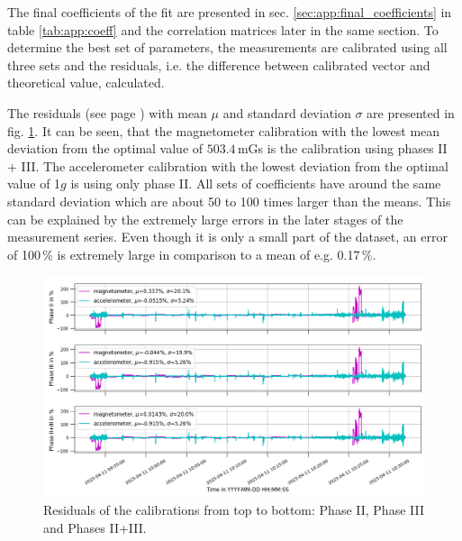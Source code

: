 The final coefficients of the fit are presented in sec. \ref{sec:app:final_coefficients} in table \ref{tab:app:coeff} and the correlation matrices later in the same section. To determine the best set of parameters, the measurements are calibrated using all three sets and the residuals, i.e. the difference between calibrated vector and theoretical value, calculated. 

The residuals (see page \pageref{eq:residuals}) with mean $\mu$ and standard deviation $\sigma$ are presented in fig. \ref{fig:res:residuals}. It can be seen, that the magnetometer calibration with the lowest mean deviation from the optimal value of $503.4$\,mGs is the calibration using phases II + III. The accelerometer calibration with the lowest deviation from the optimal value of 1$g$ is using only phase II. All sets of coefficients have around the same standard deviation which are about 50 to 100 times larger than the means. This can be explained by the extremely large errors in the later stages of the measurement series. Even though it is only a small part of the dataset, an error of 100\,\% is extremely large in comparison to a mean of e.g. 0.17\,\%.
\begin{figure}[H]
    \centering
    \includegraphics[width=\linewidth]{images/04_results/residuals_mag_acc_calibrations.png}
    \caption[Residuals of the calibrations.]{Residuals of the calibrations from top to bottom: Phase II, Phase III and Phases II+III.}
    \label{fig:res:residuals}
\end{figure}

